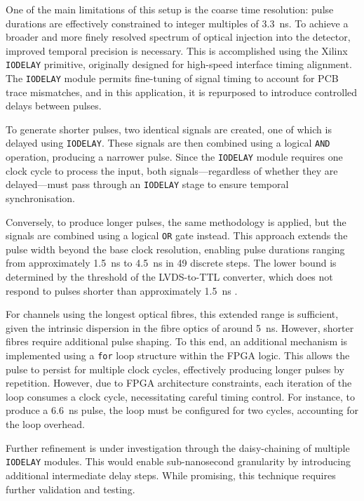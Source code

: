 \documentclass[a4paper,11pt]{article}
\begin{document}
One of the main limitations of this setup is the coarse time resolution: pulse durations are effectively constrained to integer multiples of \SI{3.3}{\nano\second}. To achieve a broader and more finely resolved spectrum of optical injection into the detector, improved temporal precision is necessary. This is accomplished using the Xilinx \texttt{IODELAY} primitive, originally designed for high-speed interface timing alignment. The \texttt{IODELAY} module permits fine-tuning of signal timing to account for PCB trace mismatches, and in this application, it is repurposed to introduce controlled delays between pulses.

To generate shorter pulses, two identical signals are created, one of which is delayed using \texttt{IODELAY}. These signals are then combined using a logical \texttt{AND} operation, producing a narrower pulse. Since the \texttt{IODELAY} module requires one clock cycle to process the input, both signals—regardless of whether they are delayed—must pass through an \texttt{IODELAY} stage to ensure temporal synchronisation.

Conversely, to produce longer pulses, the same methodology is applied, but the signals are combined using a logical \texttt{OR} gate instead. This approach extends the pulse width beyond the base clock resolution, enabling pulse durations ranging from approximately \SI{1.5}{\nano\second} to \SI{4.5}{\nano\second} in 49 discrete steps. The lower bound is determined by the threshold of the LVDS-to-TTL converter, which does not respond to pulses shorter than approximately \SI{1.5}{\nano\second} .

For channels using the longest optical fibres, this extended range is sufficient, given the intrinsic dispersion in the fibre optics of around \SI{5}{\nano\second}. However, shorter fibres require additional pulse shaping. To this end, an additional mechanism is implemented using a \texttt{for} loop structure within the FPGA logic. This allows the pulse to persist for multiple clock cycles, effectively producing longer pulses by repetition. However, due to FPGA architecture constraints, each iteration of the loop consumes a clock cycle, necessitating careful timing control. For instance, to produce a \SI{6.6}{\nano\second} pulse, the loop must be configured for two cycles, accounting for the loop overhead.

Further refinement is under investigation through the daisy-chaining of multiple \texttt{IODELAY} modules. This would enable sub-nanosecond granularity by introducing additional intermediate delay steps. While promising, this technique requires further validation and testing.
\end{document}
